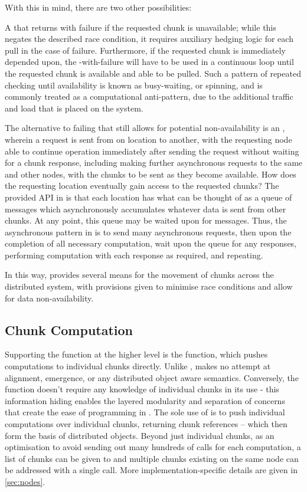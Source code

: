 With this in mind, there are two other possibilities:

A  that returns with failure if the requested chunk is unavailable; while this negates the described race condition, it requires auxiliary hedging logic for each pull in the case of failure.
Furthermore, if the requested chunk is immediately depended upon, the -with-failure will have to be used in a continuous loop until the requested chunk is available and able to be pulled.
Such a pattern of repeated checking until availability is known as busy-waiting, or spinning, and is commonly treated as a computational anti-pattern, due to the additional traffic and load that is placed on the system\cite{corbet2023}.

The alternative to failing  that still allows for potential non-availability is an , wherein a request is sent from on location to another, with the requesting node able to continue operation immediately after sending the request without waiting for a chunk response, including making further asynchronous requests to the same and other nodes, with the chunks to be sent as they become available.
How does the requesting location eventually gain access to the requested chunks?
The provided API in \lsr{} is that each location has what can be thought of as a queue of messages which asynchronously accumulates whatever data is sent from other chunks.
At any point, this queue may be waited upon for messages.
Thus, the asynchronous pattern in \lsr{} is to send many asynchronous requests, then upon the completion of all necessary computation, wait upon the queue for any responses, performing computation with each response as required, and repeating.

In this way, \lsr{} provides several means for the movement of chunks across the distributed system, with provisions given to minimise race conditions and allow for data non-availability.

\subsection{Chunk Computation}\label{sec:chunk-computation}

Supporting the  function at the higher level is the  function, which pushes computations to individual chunks directly.
Unlike ,  makes no attempt at alignment, emergence, or any distributed object aware semantics.
Conversely, the  function doesn't require any knowledge of individual chunks in its use - this information hiding enables the layered modularity and separation of concerns that create the ease of programming in \lsr{}.
The sole use of  is to push individual computations over individual chunks, returning chunk references -- which then form the basis of distributed objects.
Beyond just individual chunks, as an optimisation to avoid sending out many hundreds of calls for each computation, a list of chunks can be given to  and multiple chunks existing on the same node can be addressed with a single call.
More implementation-specific details are given in \cref{sec:nodes}.

